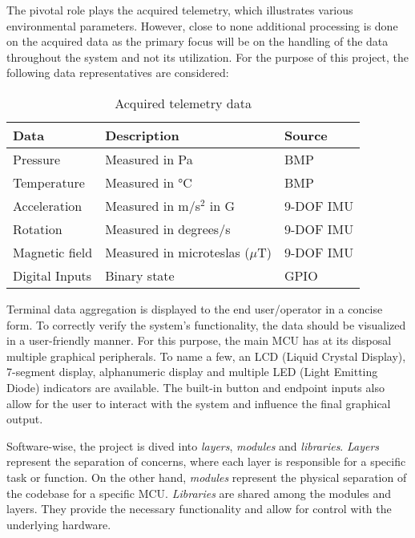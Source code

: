 The pivotal role plays the acquired telemetry, which illustrates various environmental parameters.
However, close to none additional processing is done on the acquired data as the primary focus will be on the handling
of the data throughout the system and not its utilization.
For the purpose of this project, the following data representatives are considered:
\begin{table}[ht]
    \centering
    \begin{tabular}{lll}
        \toprule
        \textbf{Data} & \textbf{Description} & \textbf{Source} \\
        \midrule
        Pressure & Measured in Pa & BMP \\
        Temperature & Measured in °C & BMP \\
        \midrule
        Acceleration & Measured in m/s\(^2\) in G & 9-DOF IMU \\
        Rotation & Measured in degrees/s & 9-DOF IMU \\
        Magnetic field & Measured in microteslas (\(\mu\)T) & 9-DOF IMU \\
        \midrule
        Digital Inputs & Binary state & GPIO \\
        \bottomrule
    \end{tabular}
    \caption{Acquired telemetry data}
    \label{tab:telemetry_data}
\end{table}

Terminal data aggregation is displayed to the end user/operator in a concise form.
To correctly verify the system's functionality, the data should be visualized in a user-friendly manner.
For this purpose, the main MCU has at its disposal multiple graphical peripherals.
To name a few, an LCD (Liquid Crystal Display), 7-segment display, alphanumeric display and multiple LED
(Light Emitting Diode) indicators are available.
The built-in button and endpoint inputs also allow for the user to interact with the system and influence the
final graphical output.

Software-wise, the project is dived into \textit{layers}, \textit{modules} and \textit{libraries}.
\textit{Layers} represent the separation of concerns, where each layer is responsible for a specific task or function.
On the other hand, \textit{modules} represent the physical separation of the codebase for a specific MCU\@.
\textit{Libraries} are shared among the modules and layers.
They provide the necessary functionality and allow for control with the underlying hardware.
